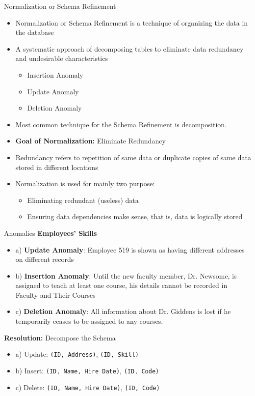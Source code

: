 \documentclass[aspectratio=169, xcolor=dvipsnames]{beamer}
\begin{document}
\begin{frame}{Normalization or Schema Refinement}
    \begin{itemize}[<+->]
        \item Normalization or Schema Refinement is a technique of organizing the data in the database
        \item A systematic approach of decomposing tables to eliminate data redundancy and undesirable characteristics
        \begin{itemize}
            \item[$\triangleright$] Insertion Anomaly
            \item[$\triangleright$] Update Anomaly
            \item[$\triangleright$] Deletion Anomaly
        \end{itemize}
        \item Most common technique for the Schema Refinement is decomposition.
        \item \textbf{Goal of Normalization:} Eliminate Redundancy
        \item Redundancy refers to repetition of same data or duplicate copies of same data stored in different locations
        \item Normalization is used for mainly two purpose:
        \begin{itemize}
            \item[$\triangleright$] Eliminating redundant (useless) data
            \item[$\triangleright$] Ensuring data dependencies make sense, that is, data is logically stored
        \end{itemize}
    \end{itemize}
\end{frame}

\begin{frame}{Anomalies}
    \textbf{Employees' Skills}
    \begin{itemize}[<+->]
        \item a) \textbf{Update Anomaly}: Employee 519 is shown as having different addresses on different records
        \item b) \textbf{Insertion Anomaly}: Until the new faculty member, Dr. Newsome, is assigned to teach at least one course, his details cannot be recorded in Faculty and Their Courses
        \item c) \textbf{Deletion Anomaly}: All information about Dr. Giddens is lost if he temporarily ceases to be assigned to any courses.
    \end{itemize}
    \vspace{0.5em}
    \textbf{Resolution:} Decompose the Schema
    \begin{itemize}[<+(3)->]
        \item a) Update: \texttt{(ID, Address)}, \texttt{(ID, Skill)}
        \item b) Insert: \texttt{(ID, Name, Hire Date)}, \texttt{(ID, Code)}
        \item c) Delete: \texttt{(ID, Name, Hire Date)}, \texttt{(ID, Code)}
    \end{itemize}
\end{frame}
\end{document}
